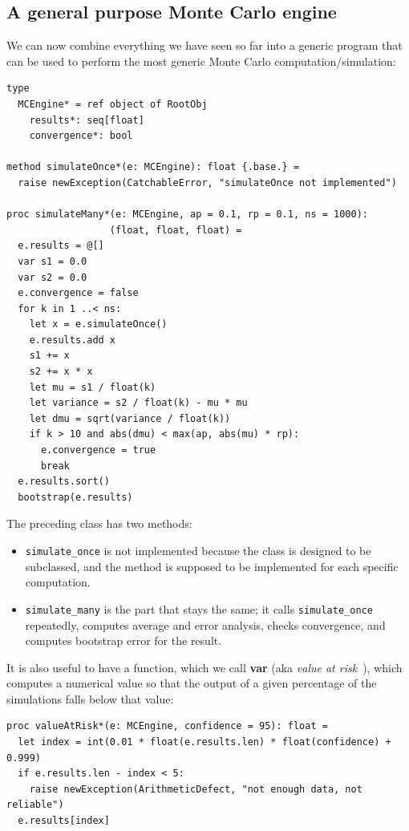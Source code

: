 \documentclass[justified, sixbynine]{tufte-book}
\def\ft{\small\tt}
\theoremstyle{plain}%
\newtheorem * {corollary}{Corollary}
\theoremstyle{definition}
\theoremstyle{remark}
\newtheorem * {remark}{Remark}
\newtheorem * {note}{Note}
\begin{document}
\begin{fullwidth}
\goodbreak\section{A general purpose Monte Carlo engine}

We can now combine everything we have seen so far into a generic program that can be used to perform the most generic Monte Carlo computation/simulation:


\begin{lstlisting}[caption={in file: {\ft nlib/montecarlo.nim}}]
type
  MCEngine* = ref object of RootObj
    results*: seq[float]
    convergence*: bool

method simulateOnce*(e: MCEngine): float {.base.} =
  raise newException(CatchableError, "simulateOnce not implemented")

proc simulateMany*(e: MCEngine, ap = 0.1, rp = 0.1, ns = 1000):
                  (float, float, float) =
  e.results = @[]
  var s1 = 0.0
  var s2 = 0.0
  e.convergence = false
  for k in 1 ..< ns:
    let x = e.simulateOnce()
    e.results.add x
    s1 += x
    s2 += x * x
    let mu = s1 / float(k)
    let variance = s2 / float(k) - mu * mu
    let dmu = sqrt(variance / float(k))
    if k > 10 and abs(dmu) < max(ap, abs(mu) * rp):
      e.convergence = true
      break
  e.results.sort()
  bootstrap(e.results)
\end{lstlisting}

The preceding class has two methods:
\begin{itemize}
\item {\ft simulate\_once} is not implemented because the class is designed to be subclassed, and the method is supposed to be implemented for each specific computation.
\item {\ft simulate\_many} is the part that stays the same; it calls {\ft simulate\_once} repeatedly, computes average and error analysis, checks convergence, and computes bootstrap error for the result.
\end{itemize}

It is also useful to have a function, which we call {\bf var} (aka {\it value at risk}~\cite{wilmott}), which computes a numerical value so that the output of a given percentage of the simulations falls below that value:

\begin{lstlisting}[caption={in file: {\ft nlib/montecarlo.nim}}]
proc valueAtRisk*(e: MCEngine, confidence = 95): float =
  let index = int(0.01 * float(e.results.len) * float(confidence) + 0.999)
  if e.results.len - index < 5:
    raise newException(ArithmeticDefect, "not enough data, not reliable")
  e.results[index]
\end{lstlisting}


\end{fullwidth}
\end{document}
